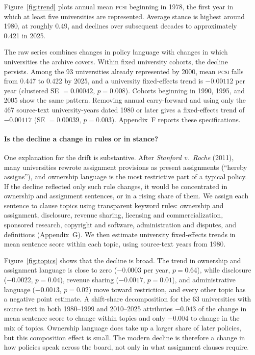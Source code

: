 Figure~\ref{fig:trend} plots annual mean \textsc{pcsi} beginning in 1978, the first year in which at least five universities are represented. Average stance is highest around 1980, at roughly 0.49, and declines over subsequent decades to approximately 0.421 in 2025.

The raw series combines changes in policy language with changes in which universities the archive covers. Within fixed university cohorts, the decline persists. Among the 93 universities already represented by 2000, mean \textsc{pcsi} falls from 0.447 to 0.422 by 2025, and a university fixed-effects trend is $-0.00112$ per year (clustered SE $= 0.00042$, $p = 0.008$). Cohorts beginning in 1990, 1995, and 2005 show the same pattern. Removing annual carry-forward and using only the 467 source-text university-years dated 1980 or later gives a fixed-effects trend of $-0.00117$ (SE $= 0.00039$, $p = 0.003$). Appendix~F reports these specifications.

\paragraph{Is the decline a change in rules or in stance?} One explanation for the drift is substantive. After \emph{Stanford v.\ Roche} (2011), many universities rewrote assignment provisions as present assignments (``hereby assigns''), and ownership language is the most restrictive part of a typical policy. If the decline reflected only such rule changes, it would be concentrated in ownership and assignment sentences, or in a rising share of them. We assign each sentence to clause topics using transparent keyword rules: ownership and assignment, disclosure, revenue sharing, licensing and commercialization, sponsored research, copyright and software, administration and disputes, and definitions (Appendix~G). We then estimate university fixed-effects trends in mean sentence score within each topic, using source-text years from 1980.

Figure~\ref{fig:topics} shows that the decline is broad. The trend in ownership and assignment language is close to zero ($-0.0003$ per year, $p = 0.64$), while disclosure ($-0.0022$, $p = 0.04$), revenue sharing ($-0.0017$, $p = 0.01$), and administrative language ($-0.0013$, $p = 0.02$) move toward restriction, and every other topic has a negative point estimate. A shift-share decomposition for the 63 universities with source text in both 1980--1999 and 2010--2025 attributes $-0.043$ of the change in mean sentence score to change within topics and only $-0.004$ to change in the mix of topics. Ownership language does take up a larger share of later policies, but this composition effect is small. The modern decline is therefore a change in how policies speak across the board, not only in what assignment clauses require.


